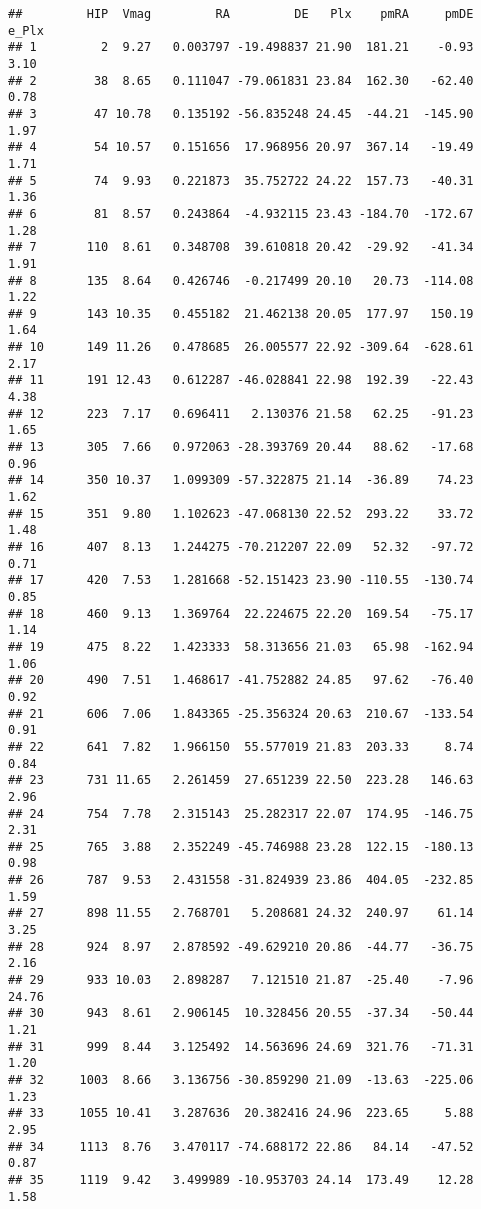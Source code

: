 \documentclass[]{article}
\begin{document}
\begin{verbatim}
##         HIP  Vmag         RA         DE   Plx    pmRA     pmDE e_Plx
## 1         2  9.27   0.003797 -19.498837 21.90  181.21    -0.93  3.10
## 2        38  8.65   0.111047 -79.061831 23.84  162.30   -62.40  0.78
## 3        47 10.78   0.135192 -56.835248 24.45  -44.21  -145.90  1.97
## 4        54 10.57   0.151656  17.968956 20.97  367.14   -19.49  1.71
## 5        74  9.93   0.221873  35.752722 24.22  157.73   -40.31  1.36
## 6        81  8.57   0.243864  -4.932115 23.43 -184.70  -172.67  1.28
## 7       110  8.61   0.348708  39.610818 20.42  -29.92   -41.34  1.91
## 8       135  8.64   0.426746  -0.217499 20.10   20.73  -114.08  1.22
## 9       143 10.35   0.455182  21.462138 20.05  177.97   150.19  1.64
## 10      149 11.26   0.478685  26.005577 22.92 -309.64  -628.61  2.17
## 11      191 12.43   0.612287 -46.028841 22.98  192.39   -22.43  4.38
## 12      223  7.17   0.696411   2.130376 21.58   62.25   -91.23  1.65
## 13      305  7.66   0.972063 -28.393769 20.44   88.62   -17.68  0.96
## 14      350 10.37   1.099309 -57.322875 21.14  -36.89    74.23  1.62
## 15      351  9.80   1.102623 -47.068130 22.52  293.22    33.72  1.48
## 16      407  8.13   1.244275 -70.212207 22.09   52.32   -97.72  0.71
## 17      420  7.53   1.281668 -52.151423 23.90 -110.55  -130.74  0.85
## 18      460  9.13   1.369764  22.224675 22.20  169.54   -75.17  1.14
## 19      475  8.22   1.423333  58.313656 21.03   65.98  -162.94  1.06
## 20      490  7.51   1.468617 -41.752882 24.85   97.62   -76.40  0.92
## 21      606  7.06   1.843365 -25.356324 20.63  210.67  -133.54  0.91
## 22      641  7.82   1.966150  55.577019 21.83  203.33     8.74  0.84
## 23      731 11.65   2.261459  27.651239 22.50  223.28   146.63  2.96
## 24      754  7.78   2.315143  25.282317 22.07  174.95  -146.75  2.31
## 25      765  3.88   2.352249 -45.746988 23.28  122.15  -180.13  0.98
## 26      787  9.53   2.431558 -31.824939 23.86  404.05  -232.85  1.59
## 27      898 11.55   2.768701   5.208681 24.32  240.97    61.14  3.25
## 28      924  8.97   2.878592 -49.629210 20.86  -44.77   -36.75  2.16
## 29      933 10.03   2.898287   7.121510 21.87  -25.40    -7.96 24.76
## 30      943  8.61   2.906145  10.328456 20.55  -37.34   -50.44  1.21
## 31      999  8.44   3.125492  14.563696 24.69  321.76   -71.31  1.20
## 32     1003  8.66   3.136756 -30.859290 21.09  -13.63  -225.06  1.23
## 33     1055 10.41   3.287636  20.382416 24.96  223.65     5.88  2.95
## 34     1113  8.76   3.470117 -74.688172 22.86   84.14   -47.52  0.87
## 35     1119  9.42   3.499989 -10.953703 24.14  173.49    12.28  1.58

\end{verbatim}
\end{document}
